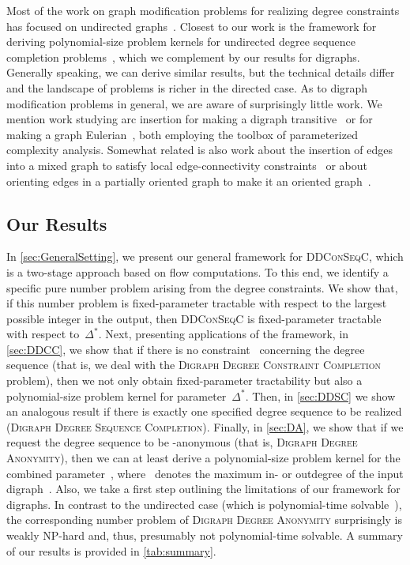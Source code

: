 \documentclass[a4paper,11pt]{article}
\theoremstyle{remark}
\theoremstyle{plain}
\theoremstyle{definition}
\newcommand{\DDCSC}{\textsc{DDConSeqC}\xspace}
\newcommand{\DDCClong}{\textsc{Digraph Degree Constraint Completion}\xspace}
\newcommand{\DDSClong}{\textsc{Digraph Degree Sequence Completion}\xspace}
\newcommand{\DAlong}{\textsc{Digraph Degree Anonymity}\xspace}
\newcommand{\degpara}{\ensuremath{\Delta^*}\xspace}
\begin{document}
Most of the work on graph modification
problems for realizing degree constraints has focused on undirected 
graphs~\cite{FNN16,Gol15,GM17,HNNS15,MS12,MT09}. Closest to our work
is the framework for deriving polynomial-size problem kernels
for undirected degree sequence completion problems~\cite{FNN16},
which we complement by our results for digraphs. 
Generally speaking, we can derive similar results, but the technical
details differ and the landscape of problems is richer 
in the directed case.
As to digraph modification problems in general, we are aware of surprisingly 
little work. 
We mention work studying arc insertion for 
making a digraph transitive~\cite{WKNU12} or 
for making a graph 
Eulerian~\cite{DMNW13}, both employing the toolbox of parameterized
complexity analysis. 
Somewhat related is also work about the insertion of edges into a mixed graph to satisfy local edge-connectivity constraints~\cite{FJ95}
or about orienting edges in a partially oriented graph to make it an 
oriented graph~\cite{BHZ18}.

\subsection{Our Results}
In \cref{sec:GeneralSetting}, we present our general framework for \DDCSC{}, which is a two-stage approach based on flow computations.
To this end, we identify a specific pure number problem arising from the degree constraints.
We show that, if this number problem is fixed-parameter tractable with respect to the largest possible integer in the output, then \DDCSC{} is fixed-parameter tractable with respect to~\degpara.
Next, presenting applications of the framework, in \cref{sec:DDCC}, we show that if there is no constraint~ concerning the degree sequence (that is, we deal with the \DDCClong problem), then we not only obtain fixed-parameter 
tractability but also a polynomial-size problem kernel for parameter~\degpara.
Then, in \cref{sec:DDSC} we show an analogous result if there is exactly one specified degree sequence to be realized (\DDSClong).
Finally, in \cref{sec:DA}, we show that if we request the degree
sequence to be -anonymous (that is, \DAlong), then we can at least derive a polynomial-size
problem kernel for the combined parameter~, where~ denotes the maximum in- or outdegree of the input digraph~.
Also, we take a first step outlining the limitations of our framework for digraphs.
In contrast to the undirected case (which is polynomial-time solvable~\cite{LT08}), the corresponding number problem of \DAlong surprisingly is weakly NP-hard and, thus, presumably not polynomial-time solvable.
A summary of our results is provided in \cref{tab:summary}.
\end{document}
